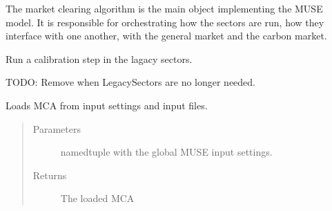 \documentclass[letterpaper,10pt,english]{sphinxmanual}
\begin{document}
\begin{fulllineitems}
The market clearing algorithm is the main object implementing the MUSE model. It is
responsible for orchestrating  how the sectors are run, how they interface with one
another, with the general market and the carbon market.

\begin{fulllineitems}
\label{\detokenize{api:muse.mca.MCA.calibrate_legacy_sectors}}
Run a calibration step in the lagacy sectors.

TODO: Remove when LegacySectors are no longer needed.

\end{fulllineitems}


\begin{fulllineitems}
\label{\detokenize{api:muse.mca.MCA.factory}}
Loads MCA from input settings and input files.
\begin{quote}\begin{description}
\item[{Parameters}] \leavevmode
{} \textendash{} namedtuple with the global MUSE input settings.

\item[{Returns}] \leavevmode
The loaded MCA

\end{description}\end{quote}

\end{fulllineitems}



\end{fulllineitems}
\end{document}
